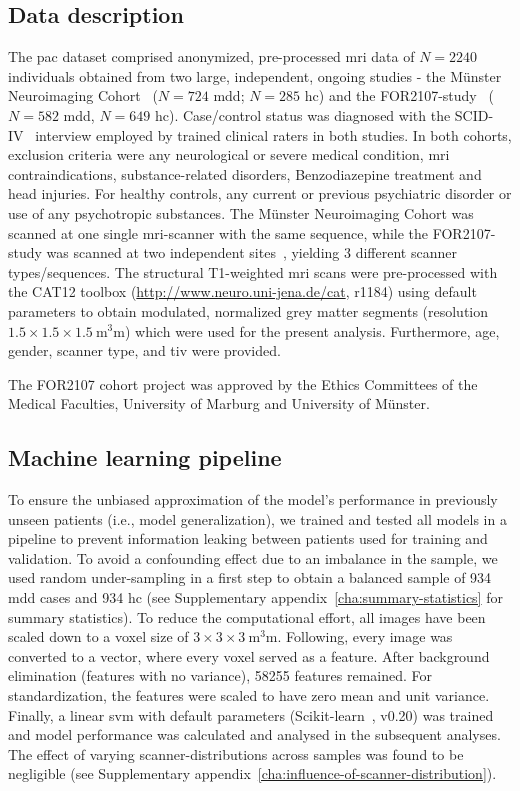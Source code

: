\documentclass[12pt,a4paper]{article}
\begin{document}
    \subsection{Data description}
    The \ac{pac} dataset comprised anonymized, pre-processed \ac{mri} data of $N=\num{2240}$ individuals obtained from two large, independent, ongoing studies - the Münster Neuroimaging Cohort~\cite{Dannlowski2015,Dannlowski2015a} ($N=\num{724}$ \ac{mdd}; $N=\num{285}$ \ac{hc}) and the FOR2107-study~\cite{Kircher2018} ($N=\num{582}$ \ac{mdd}, $N=\num{649}$ \ac{hc}). Case/control status was diagnosed with the {SCID-IV}~\cite{Wittchen1997} interview employed by trained clinical raters in both studies. In both cohorts, exclusion criteria were any neurological or severe medical condition, \ac{mri} contraindications, substance-related disorders, Benzodiazepine treatment and head injuries. For healthy controls, any current or previous psychiatric disorder or use of any psychotropic substances. The Münster Neuroimaging Cohort was scanned at one single \ac{mri}-scanner with the same sequence, while the FOR2107-study was scanned at two independent sites~\cite{Vogelbacher2018}, yielding \num{3} different scanner types/sequences. The structural T1-weighted \ac{mri} scans were pre-processed with the CAT12 toolbox (\url{http://www.neuro.uni-jena.de/cat}, r1184) using default parameters to obtain modulated, normalized grey matter segments (resolution $\num{1.5} \times \num{1.5} \times \SI{1.5}{\cubic\milli\meter}$) which were used for the present analysis. Furthermore, age, gender, scanner type, and \ac{tiv} were provided.

    The FOR2107 cohort project was approved by the Ethics Committees of the Medical Faculties, University of Marburg and University of Münster.

    \subsection{Machine learning pipeline}
    To ensure the unbiased approximation of the model's performance in previously unseen patients (i.e., model generalization), we trained and tested all models in a pipeline to prevent information leaking between patients used for training and validation. To avoid a confounding effect due to an imbalance in the sample, we used random under-sampling in a first step to obtain a balanced sample of \num{934} \ac{mdd} cases and \num{934} \ac{hc} (see Supplementary appendix~\ref{cha:summary-statistics} for summary statistics). To reduce the computational effort, all images have been scaled down to a voxel size of $\num{3} \times \num{3} \times \SI{3}{\cubic\milli\meter}$. Following, every image was converted to a vector, where every voxel served as a feature. After background elimination (features with no variance), \num{58255} features remained. For standardization, the features were scaled to have zero mean and unit variance. Finally, a linear \ac{svm} with default parameters (Scikit-learn~\cite{scikit-learn}, v0.20) was trained and model performance was calculated and analysed in the subsequent analyses. The effect of varying scanner-distributions across samples was found to be negligible (see Supplementary appendix~\ref{cha:influence-of-scanner-distribution}).
\end{document}
